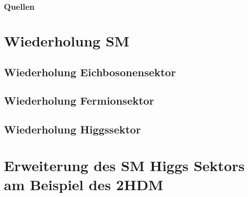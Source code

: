 \documentclass{beamer}
\begin{document}
\begin{frame} 
\frametitle{Quellen}
\section{Wiederholung SM}
\subsection{Wiederholung Eichbosonensektor}
\subsection{Wiederholung Fermionsektor}
\subsection{Wiederholung Higgssektor}
\section{Erweiterung des SM Higgs Sektors am Beispiel des 2HDM}
\printbibliography
\end{frame}

 
\end{document}
